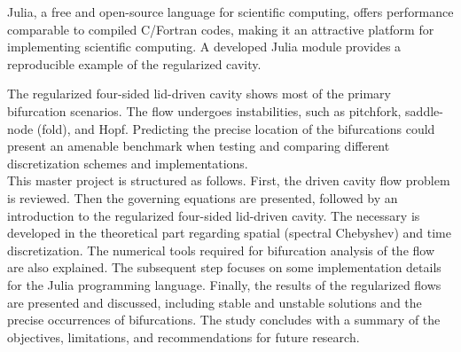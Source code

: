 Julia, a free and open-source language for scientific computing, offers
performance comparable to compiled C/Fortran codes, making it an attractive
platform for implementing scientific computing. A developed Julia module
provides a reproducible example of the regularized cavity.

The regularized four-sided lid-driven cavity shows most of the primary
bifurcation scenarios. The flow undergoes instabilities, such as pitchfork,
saddle-node (fold), and Hopf. Predicting the precise location of the
bifurcations could present an amenable benchmark when testing and comparing
different discretization schemes and implementations. \\

This master project is structured as follows. First, the driven cavity flow
problem is reviewed. Then the governing equations are presented, followed by an
introduction to the regularized four-sided lid-driven cavity. The necessary is
developed in the theoretical part regarding spatial (spectral Chebyshev) and
time discretization. The numerical tools required for bifurcation analysis of
the flow are also explained. The subsequent step focuses on some implementation
details for the Julia programming language. Finally, the results of the
regularized flows are presented and discussed, including stable and unstable
solutions and the precise occurrences of bifurcations. The study concludes with
a summary of the objectives, limitations, and recommendations for future
research.
